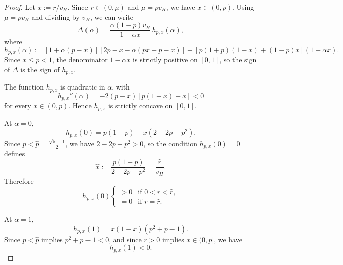 \begin{proof}
    Let $x := r/v_H$. Since $r \in (0,\mu)$ and $\mu = p v_H$, we have $x \in (0,p)$. Using $\mu = p v_H$ and dividing by $v_H$, we can write
    \begin{equation*}
        \Delta(\alpha) = \frac{\alpha (1-p) v_H}{1-\alpha x} \, h_{p,x}(\alpha),
    \end{equation*}
    where
    \begin{equation*}
        h_{p,x}(\alpha) := \left[1+\alpha (p-x)\right]\left[2p-x-\alpha (px+p-x)\right] - \left[p(1+p)(1-x)+(1-p)x\right](1-\alpha x).
    \end{equation*}
    Since $x \leq p < 1$, the denominator $1-\alpha x$ is strictly positive on $[0,1]$, so the sign of $\Delta$ is the sign of $h_{p,x}$.

    

    \noindent The function $h_{p,x}$ is quadratic in $\alpha$, with
    \begin{equation*}
        h_{p,x}''(\alpha) = -2(p-x)\left[p(1+x)-x\right] < 0
    \end{equation*}
    for every $x \in (0,p)$. Hence $h_{p,x}$ is strictly concave on $[0,1]$.

    

    \noindent At $\alpha = 0$,
    \begin{equation*}
        h_{p,x}(0) = p(1-p) - x(2-2p-p^2).
    \end{equation*}
    Since $p < \hat{p} = \frac{\sqrt{5}-1}{2}$, we have $2-2p-p^2 > 0$, so the condition $h_{p,x}(0)=0$ defines
    \begin{equation*}
        \hat{x} := \frac{p(1-p)}{2-2p-p^2} = \frac{\hat{r}}{v_H}.
    \end{equation*}
    Therefore
    \begin{equation*}
        h_{p,x}(0) \begin{cases}
            > 0 & \text{if } 0 < r < \hat{r}, \\[3pt]
            = 0 & \text{if } r = \hat{r}.
        \end{cases}
    \end{equation*}

    

    \noindent At $\alpha = 1$,
    \begin{equation*}
        h_{p,x}(1) = x(1-x)(p^2+p-1).
    \end{equation*}
    Since $p < \hat{p}$ implies $p^2+p-1 < 0$, and since $r > 0$ implies $x \in (0,p]$, we have
    \begin{equation*}
        h_{p,x}(1) < 0.
    \end{equation*}


\end{proof}
